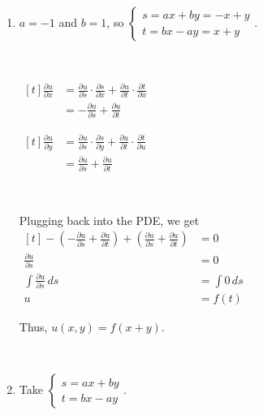 \documentclass[11pt,fleqn]{book} %
\begin{document}
\begin{enumerate}
    \item $a = -1$ and $b = 1$, so $\begin{cases}
        s = ax + by = -x + y \\
        t = bx - ay = x + y
    \end{cases}$.

    {~~~}

    \begin{minipage}[t]{0.45\linewidth}
        $\begin{aligned}[t]
            \frac{\partial u}{\partial x} 
             & = \frac{\partial u}{\partial s} \cdot \frac{\partial s}{\partial x} + \frac{\partial u}{\partial t} \cdot \frac{\partial t}{\partial x} \\
             & = -\frac{\partial u}{\partial s} + \frac{\partial u}{\partial t}
        \end{aligned}$
    \end{minipage}
    \begin{minipage}[t]{0.45\linewidth}
        $\begin{aligned}[t]
            \frac{\partial u}{\partial y} 
             & = \frac{\partial u}{\partial s} \cdot \frac{\partial s}{\partial y} + \frac{\partial u}{\partial t}\cdot \frac{\partial t}{\partial u}  \\ 
             & = \frac{\partial u}{\partial s} + \frac{\partial u}{\partial t}
        \end{aligned}$
    \end{minipage}

    {~~~}

    Plugging back into the PDE, we get $\begin{aligned}[t]
        -\left( -\frac{\partial u}{\partial s} + \frac{\partial u}{\partial t} \right) + \left( \frac{\partial u}{\partial s} + \frac{\partial u}{\partial t} \right) & = 0 \\
        \frac{\partial u}{\partial s} & = 0 \\
        \int \frac{\partial u}{\partial s} \,ds & = \int 0 \,ds \\
        u & = f(t)
    \end{aligned}$

    Thus, $u(x, y) = f(x + y)$. 
    
    {~~~}

    \item Take $\begin{cases} s = ax + by \\ t = bx - ay \end{cases}$. 


\end{enumerate}
\end{document}
